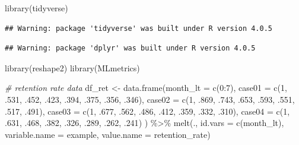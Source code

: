 \documentclass[
]{book}
\newenvironment{Shaded}{\begin{snugshade}}{\end{snugshade}}
\newcommand{\AttributeTok}[1]{\textcolor[rgb]{0.77,0.63,0.00}{#1}}
\newcommand{\CommentTok}[1]{\textcolor[rgb]{0.56,0.35,0.01}{\textit{#1}}}
\newcommand{\DecValTok}[1]{\textcolor[rgb]{0.00,0.00,0.81}{#1}}
\newcommand{\FunctionTok}[1]{\textcolor[rgb]{0.00,0.00,0.00}{#1}}
\newcommand{\NormalTok}[1]{#1}
\newcommand{\OtherTok}[1]{\textcolor[rgb]{0.56,0.35,0.01}{#1}}
\newcommand{\SpecialCharTok}[1]{\textcolor[rgb]{0.00,0.00,0.00}{#1}}
\newcommand{\StringTok}[1]{\textcolor[rgb]{0.31,0.60,0.02}{#1}}
\begin{document}
\begin{Shaded}
\begin{Highlighting}[]
\FunctionTok{library}\NormalTok{(tidyverse)}
\end{Highlighting}
\end{Shaded}

\begin{verbatim}
## Warning: package 'tidyverse' was built under R version 4.0.5
\end{verbatim}

\begin{verbatim}
## Warning: package 'dplyr' was built under R version 4.0.5
\end{verbatim}

\begin{Shaded}
\begin{Highlighting}[]
\FunctionTok{library}\NormalTok{(reshape2)}
\FunctionTok{library}\NormalTok{(MLmetrics)}
 
\CommentTok{\# retention rate data}
\NormalTok{df\_ret }\OtherTok{\textless{}{-}} \FunctionTok{data.frame}\NormalTok{(}\AttributeTok{month\_lt =} \FunctionTok{c}\NormalTok{(}\DecValTok{0}\SpecialCharTok{:}\DecValTok{7}\NormalTok{),}
                     \AttributeTok{case01 =} \FunctionTok{c}\NormalTok{(}\DecValTok{1}\NormalTok{, .}\DecValTok{531}\NormalTok{, .}\DecValTok{452}\NormalTok{, .}\DecValTok{423}\NormalTok{, .}\DecValTok{394}\NormalTok{, .}\DecValTok{375}\NormalTok{, .}\DecValTok{356}\NormalTok{, .}\DecValTok{346}\NormalTok{),}
                     \AttributeTok{case02 =} \FunctionTok{c}\NormalTok{(}\DecValTok{1}\NormalTok{, .}\DecValTok{869}\NormalTok{, .}\DecValTok{743}\NormalTok{, .}\DecValTok{653}\NormalTok{, .}\DecValTok{593}\NormalTok{, .}\DecValTok{551}\NormalTok{, .}\DecValTok{517}\NormalTok{, .}\DecValTok{491}\NormalTok{),}
                     \AttributeTok{case03 =} \FunctionTok{c}\NormalTok{(}\DecValTok{1}\NormalTok{, .}\DecValTok{677}\NormalTok{, .}\DecValTok{562}\NormalTok{, .}\DecValTok{486}\NormalTok{, .}\DecValTok{412}\NormalTok{, .}\DecValTok{359}\NormalTok{, .}\DecValTok{332}\NormalTok{, .}\DecValTok{310}\NormalTok{),}
                     \AttributeTok{case04 =} \FunctionTok{c}\NormalTok{(}\DecValTok{1}\NormalTok{, .}\DecValTok{631}\NormalTok{, .}\DecValTok{468}\NormalTok{, .}\DecValTok{382}\NormalTok{, .}\DecValTok{326}\NormalTok{, .}\DecValTok{289}\NormalTok{, .}\DecValTok{262}\NormalTok{, .}\DecValTok{241}\NormalTok{)}
\NormalTok{                     ) }\SpecialCharTok{\%\textgreater{}\%}
        \FunctionTok{melt}\NormalTok{(., }\AttributeTok{id.vars =} \FunctionTok{c}\NormalTok{(}\StringTok{\textquotesingle{}month\_lt\textquotesingle{}}\NormalTok{), }\AttributeTok{variable.name =} \StringTok{\textquotesingle{}example\textquotesingle{}}\NormalTok{, }\AttributeTok{value.name =} \StringTok{\textquotesingle{}retention\_rate\textquotesingle{}}\NormalTok{)}
 

\end{Highlighting}
\end{Shaded}
\end{document}
